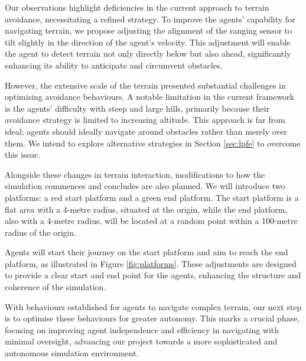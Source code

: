 \documentclass[12pt]{article}
\begin{document}
Our observations highlight deficiencies in the current approach to terrain avoidance, necessitating a refined strategy. To improve the agents' capability for navigating terrain, we propose adjusting the alignment of the ranging sensor to tilt slightly in the direction of the agent's velocity. This adjustment will enable the agent to detect terrain not only directly below but also ahead, significantly enhancing its ability to anticipate and circumvent obstacles.

However, the extensive scale of the terrain presented substantial challenges in optimising avoidance behaviours. A notable limitation in the current framework is the agents' difficulty with steep and large hills, primarily because their avoidance strategy is limited to increasing altitude. This approach is far from ideal; agents should ideally navigate around obstacles rather than merely over them. We intend to explore alternative strategies in Section \ref{sec:lpfe} to overcome this issue.

Alongside these changes in terrain interaction, modifications to how the simulation commences and concludes are also planned. We will introduce two platforms: a red start platform and a green end platform. The start platform is a flat area with a 4-metre radius, situated at the origin, while the end platform, also with a 4-metre radius, will be located at a random point within a 100-metre radius of the origin. 

Agents will start their journey on the start platform and aim to reach the end platform, as illustrated in Figure \ref{fig:platforms}. These adjustments are designed to provide a clear start and end point for the agents, enhancing the structure and coherence of the simulation. 

With behaviours established for agents to navigate complex terrain, our next step is to optimise these behaviours for greater autonomy. This marks a crucial phase, focusing on improving agent independence and efficiency in navigating with minimal oversight, advancing our project towards a more sophisticated and autonomous simulation environment.
\end{document}
